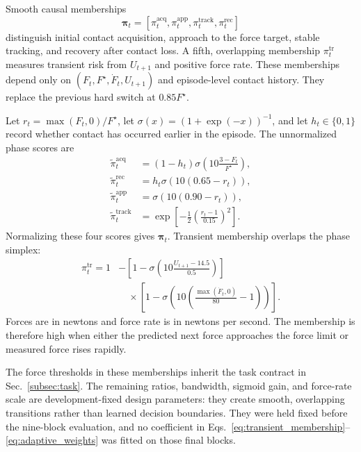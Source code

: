 Smooth causal memberships
\begin{equation}
\boldsymbol\pi_t=
[\pi_t^{\mathrm{acq}},\pi_t^{\mathrm{app}},
\pi_t^{\mathrm{track}},\pi_t^{\mathrm{rec}}]
\end{equation}
distinguish initial contact
acquisition, approach to the force target, stable tracking, and recovery after
contact loss. A fifth, overlapping membership $\pi_t^{\mathrm{tr}}$ measures
transient risk from $U_{t+1}$ and positive force rate. These memberships depend
only on $(F_t,F^\star,\dot F_t,U_{t+1})$ and episode-level contact history.
They replace the previous hard switch at $0.85F^\star$.

Let $r_t=\max(F_t,0)/F^\star$, let
$\sigma(x)=(1+\exp(-x))^{-1}$, and let $h_t\in\{0,1\}$ record whether
contact has occurred earlier in the episode. The unnormalized phase scores are
\begin{align}
\widetilde\pi_t^{\mathrm{acq}}
  &=(1-h_t)\sigma\!\left(10\frac{3-F_t}{F^\star}\right),\\
\widetilde\pi_t^{\mathrm{rec}}
  &=h_t\sigma\!\left(10(0.65-r_t)\right),\\
\widetilde\pi_t^{\mathrm{app}}
  &=\sigma\!\left(10(0.90-r_t)\right),\\
\widetilde\pi_t^{\mathrm{track}}
  &=\exp\!\left[-\frac{1}{2}\left(\frac{r_t-1}{0.15}\right)^2\right].
\end{align}
Normalizing these four scores gives $\boldsymbol\pi_t$. Transient membership
overlaps the phase simplex:
\begin{align}
\pi_t^{\mathrm{tr}}=1
&-\left[1-\sigma\!\left(10\frac{U_{t+1}-14.5}{0.5}\right)\right]\nonumber\\
&\quad\times\left[1-\sigma\!\left(10\left(\frac{\max(\dot F_t,0)}{80}-1\right)\right)\right].
\label{eq:transient_membership}
\end{align}
Forces are in newtons and force rate is in newtons per second. The membership
is therefore high when either the predicted next force approaches the force
limit or measured force rises rapidly.

The force thresholds in these memberships inherit the task contract in
Sec.~\ref{subsec:task}. The remaining ratios, bandwidth, sigmoid gain, and
force-rate scale are development-fixed design parameters: they create smooth,
overlapping transitions rather than learned decision boundaries. They were
held fixed before the nine-block evaluation, and no coefficient in
Eqs.~\eqref{eq:transient_membership}--\eqref{eq:adaptive_weights} was fitted on
those final blocks.

